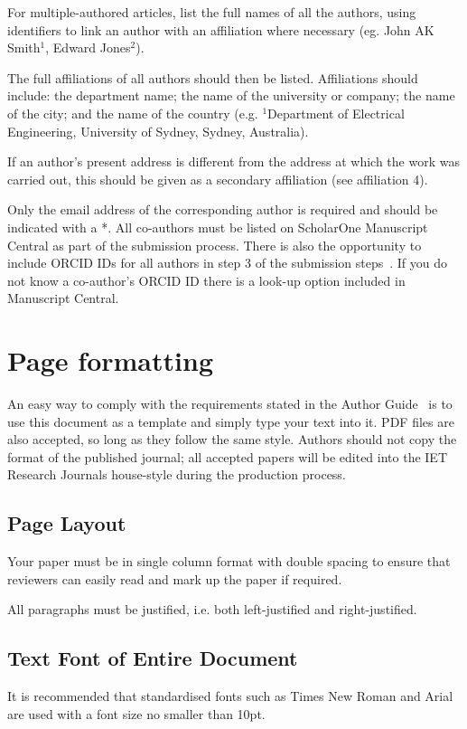 \documentclass{ietperso}
\begin{document}
\begin{ietbody}
For multiple-authored articles, list the full names of all the authors, using identifiers to link an author with an affiliation where necessary (eg. John AK Smith$^1$, Edward Jones$^2$).

The full affiliations of all authors should then be listed. Affiliations should include: the department name; the name of the university or company; the name of the city; and the name of the country (e.g. $^1$Department of Electrical Engineering, University of Sydney, Sydney, Australia).

If an author's present address is different from the address at which the work was carried out, this should be given as a secondary affiliation (see affiliation 4).

Only the email address of the corresponding author is required and should be indicated with a *. 
All co-authors must be listed on ScholarOne Manuscript Central as part of the submission process. There is also the opportunity to include ORCID  IDs for all authors in step 3 of the submission steps~\cite{author_2015_orcid}. If you do not know a co-author's ORCID ID there is a look-up option included in Manuscript Central.

\section{Page formatting}
An easy way to comply with the requirements stated in the Author Guide~\cite{author_2015_guide} is to use this document as a template and simply type your text into it. PDF files are also accepted, so long as they follow the same style. Authors should not copy the format of the published journal; all accepted papers will be edited into the IET Research Journals house-style during the production process. 

\subsection{Page Layout}
Your paper must be in single column format with double spacing to ensure that reviewers can easily read and mark up the paper if required.

All paragraphs must be justified, i.e. both left-justified and right-justified.

\subsection{Text Font of Entire Document}
It is recommended that standardised fonts such as Times New Roman and Arial are used with a font size no smaller than 10pt.


\end{ietbody}
\end{document}
